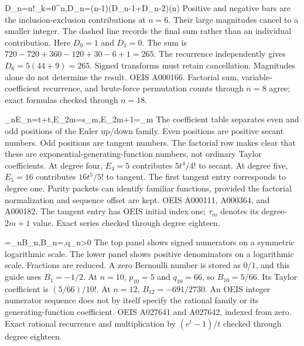 {D_n=n!\sum_{k=0}^{n},\qquad D_n=(n-1)(D_{n-1}+D_{n-2})\quad(n)}
{Positive and negative bars are the inclusion-exclusion contributions at $n=6$. Their large magnitudes cancel to a smaller integer. The dashed line records the final sum rather than an individual contribution. Here $D_0=1$ and $D_1=0$.}
{The sum is $720-720+360-120+30-6+1=265$. The recurrence independently gives $D_6=5(44+9)=265$.}
{Signed transforms must retain cancellation. Magnitudes alone do not determine the result.}
{OEIS A000166. Factorial sum, variable-coefficient recurrence, and brute-force permutation counts through $n=8$ agree; exact formulas checked through $n=18$.}

{\sum_{n}E_n=\sec t+\tan t,\quad E_{2m}=s_m,\quad E_{2m+1}=\tau_m}
{The coefficient table separates even and odd positions of the Euler up/down family. Even positions are positive secant numbers. Odd positions are tangent numbers. The factorial row makes clear that these are exponential-generating-function numbers, not ordinary Taylor coefficients.}
{At degree four, $E_4=5$ contributes $5t^4/4!$ to secant. At degree five, $E_5=16$ contributes $16t^5/5!$ to tangent. The first tangent entry corresponds to degree one.}
{Parity packets can identify familiar functions, provided the factorial normalization and sequence offset are kept.}
{OEIS A000111, A000364, and A000182. The tangent entry has OEIS initial index one; $\tau_m$ denotes its degree-$2m+1$ value. Exact series checked through degree eighteen.}

{=\sum_{n}B_n,\qquad B_n=,\quad q_n>0}
{The top panel shows signed numerators on a symmetric logarithmic scale. The lower panel shows positive denominators on a logarithmic scale. Fractions are reduced. A zero Bernoulli number is stored as $0/1$, and this guide uses $B_1=-1/2$.}
{At $n=10$, $p_{10}=5$ and $q_{10}=66$, so $B_{10}=5/66$. Its Taylor coefficient is $(5/66)/10!$. At $n=12$, $B_{12}=-691/2730$.}
{An OEIS integer numerator sequence does not by itself specify the rational family or its generating-function coefficient.}
{OEIS A027641 and A027642, indexed from zero. Exact rational recurrence and multiplication by $(e^t-1)/t$ checked through degree eighteen.}

